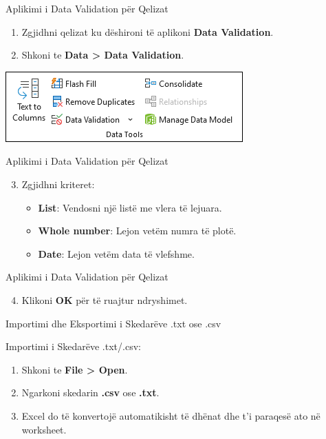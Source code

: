 \documentclass[
  ignorenonframetext,
]{beamer}
\providecommand{\tightlist}{%
  \setlength{\itemsep}{0pt}\setlength{\parskip}{0pt}}
\begin{document}
\begin{frame}{Aplikimi i Data Validation për Qelizat}
\label{aplikimi-i-data-validation-puxebr-qelizat}
\begin{enumerate}
\item
  Zgjidhni qelizat ku dëshironi të aplikoni \textbf{Data Validation}.
\item
  Shkoni te \textbf{Data \textgreater{} Data Validation}.
\end{enumerate}

\includegraphics{./images/excel11.png}
\end{frame}

\begin{frame}{Aplikimi i Data Validation për Qelizat}
\label{aplikimi-i-data-validation-puxebr-qelizat-1}
\begin{enumerate}
\setcounter{enumi}{2}
\item
  Zgjidhni kriteret:

  \begin{itemize}
  \item
    \textbf{List}: Vendosni një listë me vlera të lejuara.
  \item
    \textbf{Whole number}: Lejon vetëm numra të plotë.
  \item
    \textbf{Date}: Lejon vetëm data të vlefshme.
  \end{itemize}
\end{enumerate}
\end{frame}

\begin{frame}{Aplikimi i Data Validation për Qelizat}
\label{aplikimi-i-data-validation-puxebr-qelizat-2}
\begin{enumerate}
\setcounter{enumi}{3}
\tightlist
\item
  Klikoni \textbf{OK} për të ruajtur ndryshimet.
\end{enumerate}
\end{frame}

\begin{frame}{Importimi dhe Eksportimi i Skedarëve .txt ose .csv}
\label{importimi-dhe-eksportimi-i-skedaruxebve-.txt-ose-.csv}
\begin{block}{Importimi i Skedarëve .txt/.csv:}
\label{importimi-i-skedaruxebve-.txt.csv}
\begin{enumerate}
\item
  Shkoni te \textbf{File \textgreater{} Open}.
\item
  Ngarkoni skedarin \textbf{.csv} ose \textbf{.txt}.
\item
  Excel do të konvertojë automatikisht të dhënat dhe t'i paraqesë ato në
  worksheet.
\end{enumerate}
\end{block}
\end{frame}
\end{document}
